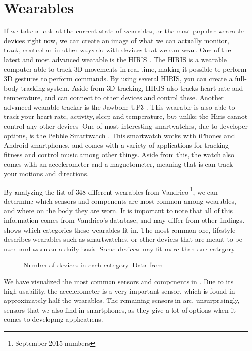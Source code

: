 \section{Wearables}\label{sec:wearables}
If we take a look at the current state of wearables, 
or the most popular wearable devices right now, 
we can create an image of what we can actually monitor, track, 
control or in other ways do with devices that we can wear. 
One of the latest and most advanced wearable is the HIRIS \cite{hirisweb}. 
The HIRIS is a wearable computer able to track 3D movements in real-time, 
making it possible to perform 3D gestures to \eg perform commands. 
By using several HIRIS, you can create a full-body tracking system.
Aside from 3D tracking, HIRIS also tracks heart rate and temperature, 
and can connect to other devices and control these. 
Another advanced wearable tracker is the Jawbone UP3 \cite{JAWBONE}. 
This wearable is also able to track your heart rate, activity, sleep and temperature, 
but unlike the Hiris cannot control any other devices. 
One of most interesting smartwatches, due to developer options, is the Pebble Smartwatch \cite{PEBBLE}. 
This smartwatch works with iPhones and Android smartphones, 
and comes with a variety of applications for tracking fitness and control music among other things. 
Aside from this, the watch also comes with an accelerometer and a magnetometer, 
meaning that is can track your motions and directions. 

By analyzing the list of 348 different wearables from Vandrico \cite{LISTOFWEARABLES}\footnote{September 2015 numbers}, 
we can determine which sensors and components are most common among wearables, 
and where on the body they are worn. 
It is important to note that all of this information comes from Vandrico's database, 
and may differ from other findings. 
 shows which categories these wearables fit in. 
The most common one, lifestyle, describes wearables such as smartwatches, 
or other devices that are meant to be used and worn on a daily basis. 
Some devices may fit more than one category.

\begin{figure}[!htb]
    \centering
    
    \caption{Number of devices in each category. Data from \protect\cite{LISTOFWEARABLES}.}
    \label{fig:wearables-category}
\end{figure}

We have visualized the most common sensors and components in .
Due to its high usability, the accelerometer is a very important sensor, 
which is found in approximately half the wearables. 
The remaining sensors in  are, unsurprisingly, sensors that we also find in smartphones, 
as they give a lot of options when it comes to developing applications. 

